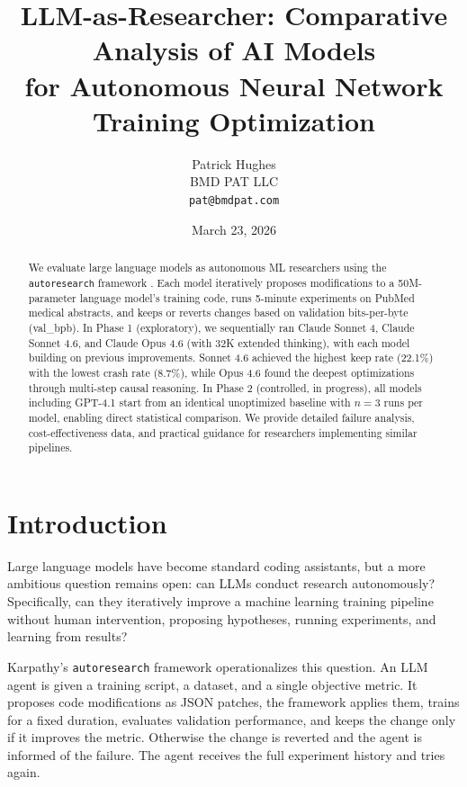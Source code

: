 \documentclass[11pt]{article}
\title{LLM-as-Researcher: Comparative Analysis of AI Models\\for Autonomous Neural Network Training Optimization}
\author{
    Patrick Hughes\\
    BMD PAT LLC\\
    \texttt{pat@bmdpat.com}
}
\date{March 23, 2026}
\begin{document}
\maketitle

\begin{abstract}
We evaluate large language models as autonomous ML researchers using the \texttt{autoresearch} framework \citep{karpathy2026autoresearch}. Each model iteratively proposes modifications to a 50M-parameter language model's training code, runs 5-minute experiments on PubMed medical abstracts, and keeps or reverts changes based on validation bits-per-byte (val\_bpb). In Phase 1 (exploratory), we sequentially ran Claude Sonnet 4, Claude Sonnet 4.6, and Claude Opus 4.6 (with 32K extended thinking), with each model building on previous improvements. Sonnet 4.6 achieved the highest keep rate (22.1\%) with the lowest crash rate (8.7\%), while Opus 4.6 found the deepest optimizations through multi-step causal reasoning. In Phase 2 (controlled, in progress), all models including GPT-4.1 start from an identical unoptimized baseline with $n=3$ runs per model, enabling direct statistical comparison. We provide detailed failure analysis, cost-effectiveness data, and practical guidance for researchers implementing similar pipelines.
\end{abstract}

\section{Introduction}
\label{sec:introduction}

Large language models have become standard coding assistants, but a more ambitious question remains open: can LLMs conduct research autonomously? Specifically, can they iteratively improve a machine learning training pipeline without human intervention, proposing hypotheses, running experiments, and learning from results?

Karpathy's \texttt{autoresearch} framework \citep{karpathy2026autoresearch} operationalizes this question. An LLM agent is given a training script, a dataset, and a single objective metric. It proposes code modifications as JSON patches, the framework applies them, trains for a fixed duration, evaluates validation performance, and keeps the change only if it improves the metric. Otherwise the change is reverted and the agent is informed of the failure. The agent receives the full experiment history and tries again.
\end{document}

